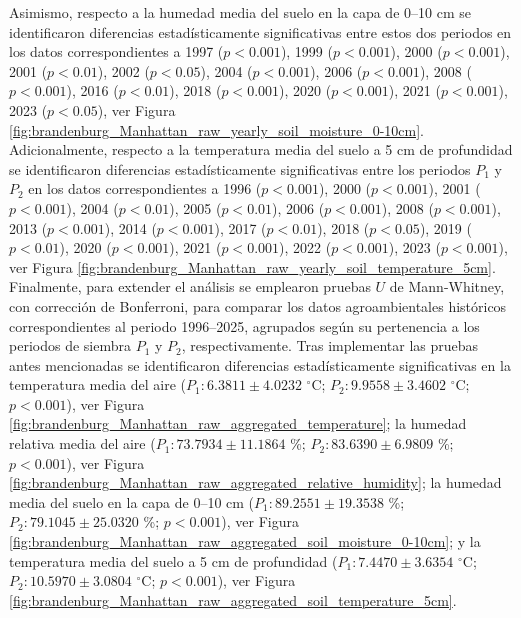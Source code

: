 Asimismo, respecto a la humedad media del suelo en la capa de 0--10 cm se identificaron diferencias estadísticamente significativas entre estos dos periodos en los datos correspondientes a 1997	($p<0.001$), 1999	($p<0.001$), 2000	($p<0.001$), 2001	($p<0.01$), 2002	($p<0.05$), 2004	($p<0.001$), 2006	($p<0.001$), 2008	($p<0.001$), 2016	($p<0.01$), 2018	($p<0.001$), 2020	($p<0.001$), 2021	($p<0.001$), 2023	($p<0.05$), ver Figura \ref{fig:brandenburg_Manhattan_raw_yearly_soil_moisture_0-10cm}.\\

Adicionalmente, respecto a la temperatura media del suelo a 5 cm de profundidad se identificaron diferencias estadísticamente significativas entre los periodos $P_1$ y $P_2$ en los datos correspondientes a 1996	($p<0.001$), 2000	($p<0.001$), 2001	($p<0.001$), 2004	($p<0.01$), 2005	($p<0.01$), 2006	($p<0.001$), 2008	($p<0.001$), 2013	($p<0.001$), 2014	($p<0.001$), 2017	($p<0.01$), 2018	($p<0.05$), 2019	($p<0.01$), 2020	($p<0.001$), 2021	($p<0.001$), 2022	($p<0.001$), 2023	($p<0.001$), ver Figura \ref{fig:brandenburg_Manhattan_raw_yearly_soil_temperature_5cm}.\\

Finalmente, para extender el análisis se emplearon pruebas $U$ de Mann-Whitney, con corrección de Bonferroni, para comparar los datos agroambientales históricos correspondientes al periodo 1996--2025, agrupados según su pertenencia a los periodos de siembra $P_1$ y $P_2$, respectivamente.  Tras implementar las pruebas antes mencionadas se identificaron diferencias estadísticamente significativas en la temperatura media del aire ($P_1:	6.3811	\pm	4.0232$ $^\circ$C; 	$P_2:	9.9558	\pm	3.4602$ $^\circ$C; 	$p<0.001$), ver Figura \ref{fig:brandenburg_Manhattan_raw_aggregated_temperature}; la humedad relativa media del aire ($P_1:	73.7934	\pm	11.1864$ \%; 	$P_2:	83.6390\pm	6.9809$ \%; 	$p<0.001$), ver Figura \ref{fig:brandenburg_Manhattan_raw_aggregated_relative_humidity}; la humedad media del suelo en la capa de 0--10 cm  ($P_1:	89.2551\pm	19.3538$ \%; 	$P_2:	79.1045\pm	25.0320$ \%; 	$p<0.001$),
 ver Figura \ref{fig:brandenburg_Manhattan_raw_aggregated_soil_moisture_0-10cm}; y la temperatura media del suelo a 5 cm de profundidad ($P_1:	7.4470\pm	3.6354$ $^\circ$C; 	$P_2:	10.5970\pm	3.0804$ $^\circ$C; 	$p<0.001$), ver Figura \ref{fig:brandenburg_Manhattan_raw_aggregated_soil_temperature_5cm}.\\

